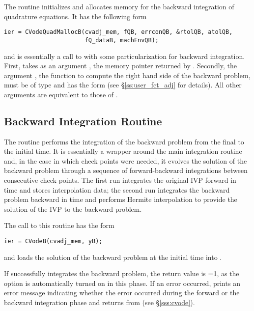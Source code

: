 The routine  initializes and allocates memory for the backward
integration of quadrature equations. It has the following form
\begin{verbatim}
ier = CVodeQuadMallocB(cvadj_mem, fQB, errconQB, &rtolQB, atolQB, 
                       fQ_dataB, machEnvQB);
\end{verbatim}
and is essentially a call to  with some particularization for 
backward integration. First,  takes as an argument 
, the memory pointer returned by .
Secondly, the argument , the {\C} function to compute the right hand side 
of the backward problem, must be of type  and
has the form  
(see \S\ref{ss:user_fct_adj} for details). 
All other arguments are equivalent to those of . 

\subsection{Backward Integration Routine}\label{sss:cvodeb}

The routine  performs the integration of the backward problem
from the final to the initial time. It is essentially a wrapper
around the {\cvodes} main integration routine  and, in the case
in which check points were needed, it evolves the solution of the backward 
problem through a sequence of forward-backward integrations between consecutive
check points. The first run integrates the original IVP forward in time and
stores interpolation data; the second run integrates the backward problem 
backward in time and performs Hermite interpolation to provide
the solution of the IVP to the backward problem.

The call to this routine has the form
\begin{verbatim}
ier = CVodeB(cvadj_mem, yB);
\end{verbatim}
and loads the solution of the backward problem at the initial time into
. 

If  successfully integrates the backward problem, the return value
is =1, as the  option is automatically turned on in this
phase. If an error occurred,  prints an error message indicating whether 
the error occurred during the forward or the backward integration phase and returns 
 from  (see \S\ref{sss:cvode}).


